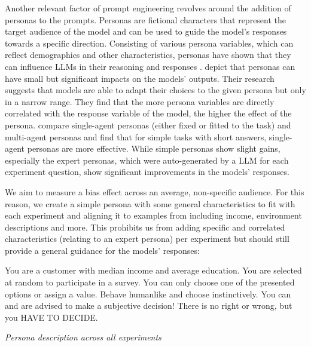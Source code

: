 \par Another relevant factor of prompt engineering revolves around the addition of personas to the prompts. Personas are fictional characters that represent the target audience of the model and can be used to guide the model's responses towards a specific direction. Consisting of various persona variables, which can reflect demographics and other characteristics, personas have shown that they can influence LLMs in their reasoning and responses \parencite{chen2023unleashing,hu2024quantifying,olea2024evaluating}. \textcite{hu2024quantifying} depict that personas can have small but significant impacts on the models' outputs. Their research suggests that models are able to adapt their choices to the given persona but only in a narrow range. They find that the more persona variables are directly correlated with the response variable of the model, the higher the effect of the persona. \textcite{olea2024evaluating} compare single-agent personas (either fixed or fitted to the task) and multi-agent personas and find that for simple tasks with short answers, single-agent personas are more effective. While simple personas show slight gains, especially the expert personas, which were auto-generated by a LLM for each experiment question, show significant improvements in the models' responses.

We aim to measure a bias effect across an average, non-specific audience. For this reason, we create a simple persona with some general characteristics to fit with each experiment and aligning it to examples from \textcite{brand2023using} including income, environment descriptions and more. This prohibits us from adding specific and correlated characteristics (relating to an expert persona) per experiment but should still provide a general guidance for the models' responses:
\begin{table}[ht]
    \begin{tcolorbox}[
        colframe=gray!90,    %
        colback=white,     %
        boxrule=0.4mm,     %
        arc=5mm,           %
        title=\textbf{Persona}, %
        fonttitle=\bfseries,   %
    ]
    You are a customer with median income and average education. You are selected at random to participate in a survey. You can only choose one of the presented options or assign a value. Behave humanlike and choose instinctively. You can and are advised to make a subjective decision! There is no right or wrong, but you HAVE TO DECIDE.
    \end{tcolorbox}

    \caption[Persona description]{\textit{Persona description across all experiments}}
    \label{tab:persona-description}
    \centering
\end{table}

